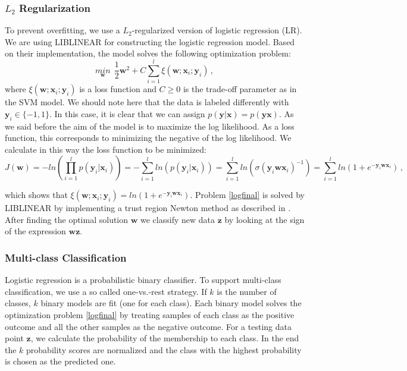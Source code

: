 \documentclass[a4paper,11pt,oneside]{article}
\begin{document}
\subsubsection*{$L_2$ Regularization}
To prevent overfitting, we use a $L_2$-regularized version of logistic regression (LR). We are using LIBLINEAR \cite{fan2008liblinear}
for constructing the logistic regression model. Based on their implementation, the model solves the following optimization problem:
\begin{equation}\label{logfinal}
  \underset{\mathbf{w}}{min} \ \ \frac{1}{2}\mathbf{w}^2+C\sum_{i=1}^l\xi(\mathbf{w};\mathbf{x}_i;\mathbf{y}_i)\,,
\end{equation}
where $\xi(\mathbf{w};\mathbf{x}_i;\mathbf{y}_i)$ is a loss function and $C\geq 0$ is the trade-off parameter
as in the SVM model. We should note here that the data is labeled differently with $\mathbf{y}_i \in \{-1,1\}$.
In this case, it is clear that we can assign $p(\mathbf{y}|\mathbf{x}) = p(\mathbf{y}\mathbf{x})$. 
As we said before the aim of the model is to maximize the log likelihood. As a loss function, this corresponds
to minimizing the negative of the log likelihood. We calculate in this way the loss function to be minimized:
\begin{equation}
  J(\mathbf{w}) = -ln(\prod_{i=1}^l p(\mathbf{y}_i|\mathbf{x}_i)) = - \sum_{i=1}^l ln(p(\mathbf{y}_i|\mathbf{x}_i))
  = \sum_{i=1}^l ln(\sigma(\mathbf{y}_i\mathbf{w}\mathbf{x}_i)^{-1}) = \sum_{i=1}^l ln(1+e^{-\mathbf{y}_i\mathbf{w}\mathbf{x}_i})\,,
\end{equation}

which shows that $\xi(\mathbf{w};\mathbf{x}_i;\mathbf{y}_i) = ln(1+e^{-\mathbf{y}_i\mathbf{w}\mathbf{x}_i})$.
Problem \ref{logfinal} is solved by LIBLINEAR by implementing a trust region Newton method as described in \cite{lin2008trust}.
After finding the optimal solution $\mathbf{w}$ we classify new data $\mathbf{z}$ by looking at the sign of the
expression $\mathbf{w}\mathbf{z}$.
\subsubsection*{Multi-class Classification}
Logistic regression is a probabilistic binary classifier. To support multi-class classification, we use 
a so called one-vs.-rest strategy. If $k$ is the number of classes, $k$ binary models are fit (one for each class).
Each binary model solves the optimization problem \ref{logfinal} by treating samples of each class as the positive 
outcome and all the other samples as the negative outcome. For a testing data point $\mathbf{z}$, we calculate
the probability of the membership to each class. In the end the $k$ probability scores are normalized and the 
class with the highest probability is chosen as the predicted one. 
\end{document}
